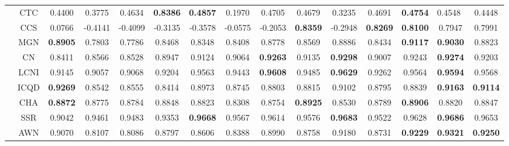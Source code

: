 \begin{table*}[htb]
\begin{tabular}{ccccccccccccccc}
                      & CTC   & 0.4400          & 0.3775          & 0.4634          & \textbf{0.8386} & \textbf{0.4857} & 0.1970          & 0.4705          & 0.4679          & 0.3235          & 0.4691          & \textbf{0.4754} & \multicolumn{1}{l}{0.4548} & 0.4448          \\
                      & CCS   & 0.0766          & -0.4141         & -0.4099         & -0.3135         & -0.3578         & -0.0575         &  -0.2053         & \textbf{0.8359} & -0.2948         & \textbf{0.8269} & \textbf{0.8100} & 0.7947 & 0.7991                              \\
                      & MGN   & \textbf{0.8905} & 0.7803          & 0.7786          & 0.8468          & 0.8348          & 0.8408          & 0.8778          & 0.8569          & 0.8886          & 0.8434          & \textbf{0.9117} & \textbf{0.9030} & 0.8823                     \\
                      & CN    & 0.8411          & 0.8566          & 0.8528          & 0.8947          & 0.9124          & 0.9064          & \textbf{0.9263} & 0.9135          & \textbf{0.9298} & 0.9007          & 0.9243          & \textbf{0.9274} & 0.9203                     \\
                      & LCNI  & 0.9145          & 0.9057          & 0.9068          & 0.9204          & 0.9563          & 0.9443          & \textbf{0.9608} & 0.9485          & \textbf{0.9629} & 0.9262          & 0.9564          & \textbf{0.9594} & 0.9568                     \\
                      & ICQD  & \textbf{0.9269} & 0.8542          & 0.8555          & 0.8414          & 0.8973          & 0.8745          & 0.8803          & 0.8815          & 0.9102 & 0.8795          & 0.8839          & \textbf{0.9163} & \textbf{0.9114}                     \\
                      & CHA   & \textbf{0.8872} & 0.8775          & 0.8784          & 0.8848 & 0.8823          & 0.8308          & 0.8754          & \textbf{0.8925}          & 0.8530          & 0.8789          & \textbf{0.8906} & 0.8820 & 0.8847                              \\
                      & SSR   & 0.9042          & 0.9461          & 0.9483          & 0.9353          & \textbf{0.9668} & 0.9567          & 0.9614          & 0.9576          & \textbf{0.9683} & 0.9522          & 0.9628          & \textbf{0.9686} & 0.9653                     \\ \hline
                      & AWN   & 0.9070          & 0.8107          & 0.8086          & 0.8797          & 0.8606          & 0.8388          & 0.8990          & 0.8758          & 0.9180 & 0.8731          & \textbf{0.9229} & \textbf{0.9321} & \textbf{0.9250}                     \\

\end{tabular}
\end{table*}

